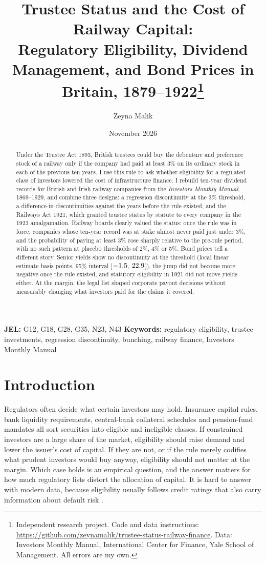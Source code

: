 \documentclass[11pt]{article}
\title{\textbf{Trustee Status and the Cost of Railway Capital:}\\[2pt]
\large Regulatory Eligibility, Dividend Management, and Bond Prices in Britain, 1879--1922\thanks{Independent research project. Code and data instructions: \url{https://github.com/zeynamalik/trustee-status-railway-finance}. Data: Investors Monthly Manual, International Center for Finance, Yale School of Management. All errors are my own.}}
\author{Zeyna Malik}
\date{November 2026}
\begin{document}
\maketitle

\begin{abstract}
\noindent Under the Trustee Act 1893, British trustees could buy the debenture and preference stock of a railway only if the company had paid at least 3\% on its ordinary stock in each of the previous ten years. I use this rule to ask whether eligibility for a regulated class of investors lowered the cost of infrastructure finance. I rebuild ten-year dividend records for British and Irish railway companies from the \textit{Investors Monthly Manual}, 1869--1929, and combine three designs: a regression discontinuity at the 3\% threshold, a difference-in-discontinuities against the years before the rule existed, and the Railways Act 1921, which granted trustee status by statute to every company in the 1923 amalgamation. Railway boards clearly valued the status: once the rule was in force, companies whose ten-year record was at stake almost never paid just under 3\%, and the probability of paying at least 3\% rose sharply relative to the pre-rule period, with no such pattern at placebo thresholds of 2\%, 4\% or 5\%. Bond prices tell a different story. Senior yields show no discontinuity at the threshold (local linear estimate \rdTauHone{} basis points, 95\% interval [$-1.5$, $22.9$]), the jump did not become more negative once the rule existed, and statutory eligibility in 1921 did not move yields either. At the margin, the legal list shaped corporate payout decisions without measurably changing what investors paid for the claims it covered.
\end{abstract}

\vspace{6pt}
\noindent\textbf{JEL:} G12, G18, G28, G35, N23, N43 \quad \textbf{Keywords:} regulatory eligibility, trustee investments, regression discontinuity, bunching, railway finance, Investors Monthly Manual

\newpage
\section{Introduction}

Regulators often decide what certain investors may hold. Insurance capital rules, bank liquidity requirements, central-bank collateral schedules and pension-fund mandates all sort securities into eligible and ineligible classes. If constrained investors are a large share of the market, eligibility should raise demand and lower the issuer's cost of capital. If they are not, or if the rule merely codifies what prudent investors would buy anyway, eligibility should not matter at the margin. Which case holds is an empirical question, and the answer matters for how much regulatory lists distort the allocation of capital. It is hard to answer with modern data, because eligibility usually follows credit ratings that also carry information about default risk \citep{KisgenStrahan2010}.
\end{document}
